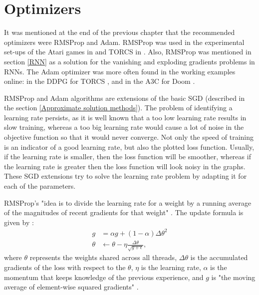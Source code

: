 \section{Optimizers}\label{Optimizers}
It was mentioned at the end of the previous chapter that the recommended optimizers were RMSProp and Adam. RMSProp was used in the experimental set-ups of the Atari games in \cite{DBLP:journals/corr/MnihKSGAWR13} and TORCS in \cite{DBLP:journals/corr/MnihBMGLHSK16}. Also, RMSProp was mentioned in section \ref{RNN} as a solution for the vanishing and exploding gradients problems in RNNs. The Adam optimizer was more often found in the working examples online: in the DDPG for TORCS \cite{DDPG_Torcs}, and in the A3C for Doom \cite{A3CDoom}.

RMSProp and Adam algorithms are extensions of the basic SGD (described in the section \ref{Approximate solution methods}). The problem of identifying a learning rate persists, as it is well known that a too low learning rate results in slow training, whereas a too big learning rate would cause a lot of noise in the objective function so that it would never converge. Not only the speed of training is an indicator of a good learning rate, but also the plotted loss function. Usually, if the learning rate is smaller, then the loss function will be smoother, whereas if the learning rate is greater then the loss function will look noisy in the graphs. These SGD extensions try to solve the learning rate problem by adapting it for each of the parameters.

RMSProp's "idea is to divide the learning rate for a weight by a running average of the magnitudes of recent gradients for that weight" \cite{RMSProp}. The update formula is given by \cite{DBLP:journals/corr/MnihBMGLHSK16}:
\begin{equation}\label{RMSPropUpdate}
\begin{aligned}
g&=\alpha g + (1-\alpha)\Delta \theta^2\\
\theta & \leftarrow \theta - \eta  \frac{\Delta \theta}{\sqrt{g+\epsilon}},
\end{aligned}
\end{equation}
where $\theta$ represents the weights shared across all threads, $\Delta \theta$ is the accumulated gradients of the loss with respect to the $\theta$, $\eta$ is the learning rate, $\alpha$ is the momentum that keeps knowledge of the previous experience, and $g$ is "the moving average of element-wise squared gradients" \cite{DBLP:journals/corr/MnihBMGLHSK16}.

